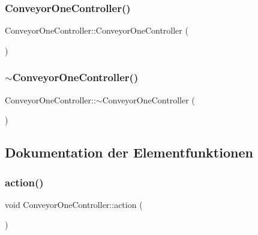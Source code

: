 \subsubsection{\texorpdfstring{Conveyor\+One\+Controller()}{ConveyorOneController()}}
{\footnotesize\ttfamily Conveyor\+One\+Controller\+::\+Conveyor\+One\+Controller (\begin{DoxyParamCaption}{ }\end{DoxyParamCaption})}

\hypertarget{class_conveyor_one_controller_a7e284560fd1dd2b55b38418b3b7e9e16}{}\label{class_conveyor_one_controller_a7e284560fd1dd2b55b38418b3b7e9e16} 
\subsubsection{\texorpdfstring{$\sim$\+Conveyor\+One\+Controller()}{~ConveyorOneController()}}
{\footnotesize\ttfamily Conveyor\+One\+Controller\+::$\sim$\+Conveyor\+One\+Controller (\begin{DoxyParamCaption}{ }\end{DoxyParamCaption})\hspace{0.3cm}{\ttfamily [virtual]}}



\subsection{Dokumentation der Elementfunktionen}
\hypertarget{class_conveyor_one_controller_a4afc5302a370ec6b1d19514df56ce64c}{}\label{class_conveyor_one_controller_a4afc5302a370ec6b1d19514df56ce64c} 
\subsubsection{\texorpdfstring{action()}{action()}}
{\footnotesize\ttfamily void Conveyor\+One\+Controller\+::action (\begin{DoxyParamCaption}{ }\end{DoxyParamCaption})}

\hypertarget{class_conveyor_one_controller_a837b5b29b5933795413a50446abd9861}{}\label{class_conveyor_one_controller_a837b5b29b5933795413a50446abd9861} 
